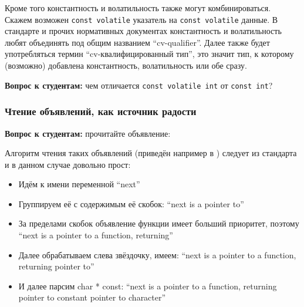 \documentclass[a4paper,12pt,oneside]{article}
\newif\ifanswers
\begin{document}
Кроме того константность и волатильность также могут комбинироваться. Скажем возможен \lstinline!const volatile! указатель на \lstinline!const volatile! данные. В стандарте и прочих нормативных документах константность и волатильность любят объединять под общим названием ``cv-qualifier''. Далее также будет употребляться термин ``cv-квалифицированный тип'', это значит тип, к которому (возможно) добавлена константность, волатильность или обе сразу.

\textbf{Вопрос к студентам:} чем отличается \lstinline!const volatile int! от \lstinline!const int!?

\ifanswers
Правильный ответ: константность означает, что оттуда можно только читать. При этом волатильность означает, что чтения оттуда нельзя переупорядочивать. Интересно, что здесь \lstinline!const! это по сути способ сказать \lstinline!readonly!, чем семантически выразить неизменность данных.
\fi

\subsubsection{Чтение объявлений, как источник радости}\label{AlgDecl}

\textbf{Вопрос к студентам:} прочитайте объявление:



\ifanswers
Правильный ответ: указатель на функцию, возвращающую указатель на константный указатель на символ.
\fi

Алгоритм чтения таких объявлений (приведён например в \cite{linden}) следует из стандарта и в данном случае довольно прост:

\begin{itemize}
\item
Идём к имени переменной ``next''
\item
Группируем её с содержимым её скобок: ``next is a pointer to''
\item
За пределами скобок объявление функции имеет больший приоритет, поэтому ``next is a pointer to a function, returning''
\item
Далее обрабатываем слева звёздочку, имеем: ``next is a pointer to a function, returning pointer to''
\item
И далее парсим char * const: ``next is a pointer to a function, returning pointer to constant pointer to character''
\end{itemize}
\end{document}

